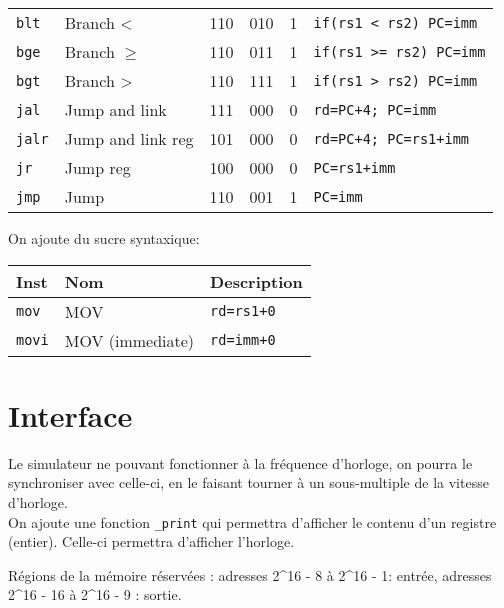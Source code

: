 \documentclass[a4paper]{article}
\begin{document}
\begin{longtable}{|l|l|c|c|c|l|}
        \texttt{blt}   & Branch <                        & 110    & 010    & 1      & \texttt{if(rs1 < rs2) PC=imm} \\
        \texttt{bge}   & Branch \(\geqslant\)            & 110    & 011    & 1      & \texttt{if(rs1 >= rs2) PC=imm}\\
        \texttt{bgt}   & Branch >                        & 110    & 111    & 1      & \texttt{if(rs1 > rs2) PC=imm} \\
        \hline
        \texttt{jal}   & Jump and link                   & 111    & 000    & 0      &\texttt{rd=PC+4; PC=imm}       \\
        \texttt{jalr}  & Jump and link reg               & 101    & 000    & 0      &\texttt{rd=PC+4; PC=rs1+imm}   \\
        \texttt{jr}    & Jump reg                        & 100    & 000    & 0      &\texttt{PC=rs1+imm}            \\
        \texttt{jmp}   & Jump                            & 110    & 001    & 1      &\texttt{PC=imm}                \\
        \hline
    \end{longtable}

    On ajoute du sucre syntaxique:

    \begin{longtable}{|l|l|l|}
        \hline
        Inst          & Nom             & Description       \\
        \hline
        \texttt{mov}  & MOV             & \texttt{rd=rs1+0} \\
        \texttt{movi} & MOV (immediate) & \texttt{rd=imm+0} \\
        \hline
    \end{longtable}
    \section{Interface}
    Le simulateur ne pouvant fonctionner à la fréquence d'horloge, on pourra le synchroniser avec celle-ci, en le faisant tourner à un sous-multiple de la vitesse d'horloge.\\
    On ajoute une fonction \texttt{\_print} qui permettra d'afficher le contenu d'un registre (entier). Celle-ci permettra d'afficher l'horloge.


    Régions de la mémoire réservées : adresses 2^16 - 8 à 2^16 - 1: entrée, adresses 2^16 - 16 à 2^16 - 9 : sortie.
\end{document}
